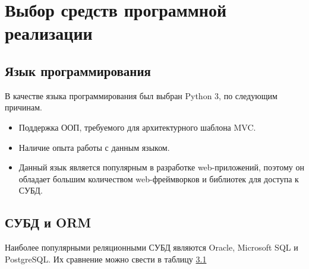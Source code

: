

\section{Выбор средств программной реализации}

\subsection{Язык программирования}
В качестве языка программирования был выбран Python 3\cite{python_doc}, по следующим причинам.
\begin{itemize}
	\item Поддержка ООП, требуемого для архитектурного шаблона MVC.
	\item Наличие опыта работы с данным языком.
	\item Данный язык является популярным в разработке web-приложений, поэтому он обладает большим количеством web-фреймворков и библиотек для доступа к СУБД.
\end{itemize}

\subsection{СУБД и ORM}
Наиболее популярными реляционными СУБД являются Oracle, Microsoft SQL и PostgreSQL\cite{dbm_source}. Их сравнение\cite{dbm_source2} можно свести в таблицу \hyperref[dms_table]{3.1}

